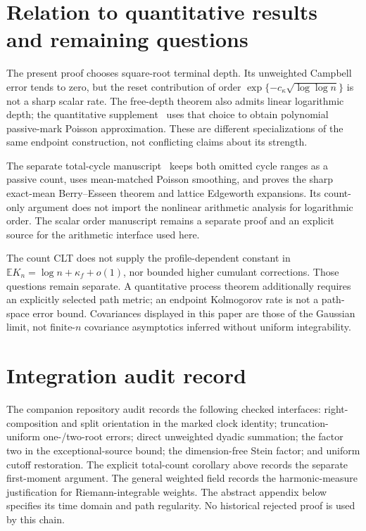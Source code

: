 \documentclass[11pt]{article}
\theoremstyle{definition}
\theoremstyle{remark}
\newcommand{\Ee}{\mathbb E}
\begin{document}
\section{Relation to quantitative results and remaining questions}

The present proof chooses square-root terminal depth. Its unweighted
Campbell error tends to zero, but the reset contribution of order
$\exp\{-c_\kappa\sqrt{\log\log n}\}$ is not a sharp scalar rate.
The free-depth theorem also admits linear logarithmic depth; the
quantitative supplement~\cite{LongBerry2026} uses that choice to obtain
polynomial passive-mark Poisson approximation. These are different
specializations of the same endpoint construction, not conflicting claims
about its strength.

The separate total-cycle manuscript~\cite{LongCount2026} keeps both omitted
cycle ranges as a passive count, uses mean-matched Poisson smoothing, and
proves the sharp exact-mean Berry--Esseen theorem and lattice Edgeworth
expansions. Its count-only argument does not import the nonlinear arithmetic
analysis for logarithmic order. The scalar order manuscript remains a
separate proof and an explicit source for the arithmetic interface used here.

The count CLT does not supply the profile-dependent constant in
$\Ee K_n=\log n+\kappa_f+o(1)$, nor bounded higher cumulant corrections.
Those questions remain separate. A quantitative process theorem additionally
requires an explicitly selected path metric; an endpoint Kolmogorov rate
is not a path-space error bound. Covariances displayed in this paper are
those of the Gaussian limit, not finite-$n$ covariance asymptotics inferred
without uniform integrability.

\section{Integration audit record}

The companion repository audit records the following checked interfaces:
right-composition and split orientation in the marked clock identity;
truncation-uniform one-/two-root errors; direct unweighted dyadic summation;
the factor two in the exceptional-source bound; the dimension-free Stein
factor; and uniform cutoff restoration. The explicit total-count corollary
above records the separate first-moment argument. The general weighted
field records the harmonic-measure justification for Riemann-integrable
weights. The abstract appendix below specifies its time domain and path
regularity. No historical rejected proof is used by this chain.
\end{document}

